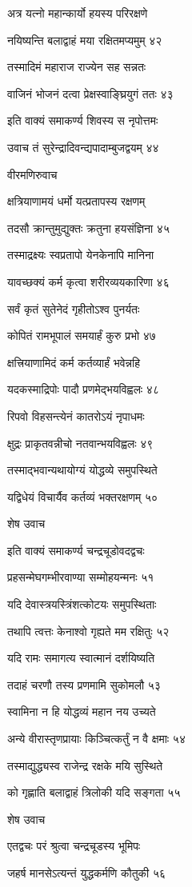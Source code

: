 अत्र यत्नो महान्कार्यो हयस्य परिरक्षणे

नयिष्यन्ति बलाद्वाहं मया रक्षितमप्यमुम् ४२

तस्मादिमं महाराज राज्येन सह सन्नतः

वाजिनं भोजनं दत्वा प्रेक्षस्वाङ्घ्रियुगं ततः ४३

इति वाक्यं समाकर्ण्य शिवस्य स नृपोत्तमः

उवाच तं सुरेन्द्रादिवन्द्यपादाम्बुजद्वयम् ४४

वीरमणिरुवाच

क्षत्रियाणामयं धर्मो यत्प्रतापस्य रक्षणम्

तदसौ क्रान्तुमुद्युक्तः क्रतुना हयसंज्ञिना ४५

तस्माद्रक्ष्यः स्वप्रतापो येनकेनापि मानिना

यावच्छक्यं कर्म कृत्वा शरीरव्ययकारिणा ४६

सर्वं कृतं सुतेनेदं गृहीतोऽश्व पुनर्यतः

कोपितं रामभूपालं समयार्हं कुरु प्रभो ४७

क्षत्त्रियाणामिदं कर्म कर्तव्यार्हं भवेन्नहि

यदकस्माद्रिपोः पादौ प्रणमेद्भयविह्वलः ४८

रिपवो विहसन्त्येनं कातरोऽयं नृपाधमः

क्षुद्रः प्राकृतवन्नीचो नतवान्भयविह्वलः ४९

तस्माद्भवान्यथायोग्यं योद्धव्ये समुपस्थिते

यद्विधेयं विचार्यैव कर्तव्यं भक्तरक्षणम् ५०

शेष उवाच

इति वाक्यं समाकर्ण्य चन्द्रचूडोवदद्वचः

प्रहसन्मेघगम्भीरवाण्या सम्मोहयन्मनः ५१

यदि देवास्त्रयस्त्रिंशत्कोटयः समुपस्थिताः

तथापि त्वत्तः केनाश्वो गृह्यते मम रक्षितुः ५२

यदि रामः समागत्य स्वात्मानं दर्शयिष्यति

तदाहं चरणौ तस्य प्रणमामि सुकोमलौ ५३

स्वामिना न हि योद्धव्यं महान नय उच्यते

अन्ये वीरास्तृणप्रायाः किञ्चित्कर्तुं न वै क्षमाः ५४

तस्माद्युद्ध्यस्व राजेन्द्र रक्षके मयि सुस्थिते

को गृह्णाति बलाद्वाहं त्रिलोकी यदि सङ्गता ५५

शेष उवाच

एतद्वचः परं श्रुत्वा चन्द्रचूडस्य भूमिपः

जहर्ष मानसेऽत्यन्तं युद्धकर्मणि कौतुकी ५६

